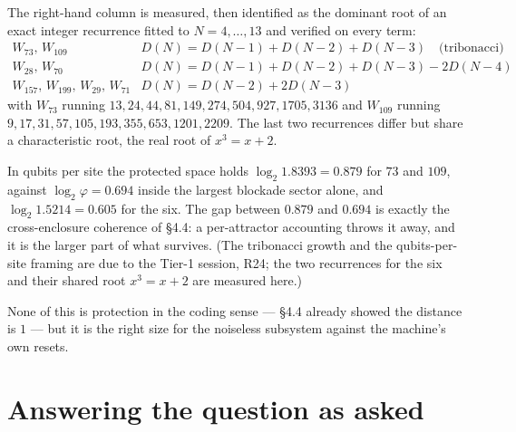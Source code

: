 \documentclass[11pt]{article}
\theoremstyle{plain}
\begin{document}
\noindent The right-hand column is measured, then identified as the dominant
root of an exact integer recurrence fitted to $N=4,\dots,13$ and verified on
every term:
\[
\begin{array}{ll}
W_{73},\,W_{109} & D(N)=D(N{-}1)+D(N{-}2)+D(N{-}3) \quad\text{(tribonacci)}\\
W_{28},\,W_{70} & D(N)=D(N{-}1)+D(N{-}2)+D(N{-}3)-2D(N{-}4)\\
W_{157},\,W_{199},\,W_{29},\,W_{71} & D(N)=D(N{-}2)+2D(N{-}3)
\end{array}
\]
with $W_{73}$ running $13,24,44,81,149,274,504,927,1705,3136$ and $W_{109}$
running $9,17,31,57,105,193,355,653,1201,2209$. The last two recurrences differ
but share a characteristic root, the real root of $x^3=x+2$.

In qubits per site the protected space holds $\log_2 1.8393=0.879$ for $73$ and
$109$, against $\log_2\varphi=0.694$ inside the largest blockade sector alone,
and $\log_2 1.5214=0.605$ for the six. The gap between $0.879$ and $0.694$ is
exactly the cross-enclosure coherence of \S4.4: a per-attractor accounting throws
it away, and it is the larger part of what survives. (The tribonacci growth and
the qubits-per-site framing are due to the Tier-1 session, R24; the two
recurrences for the six and their shared root $x^3=x+2$ are measured here.)

None of this is protection in the coding sense --- \S4.4 already showed the
distance is $1$ --- but it is the right size for the noiseless subsystem against
the machine's own resets.

\section{Answering the question as asked}
\end{document}
